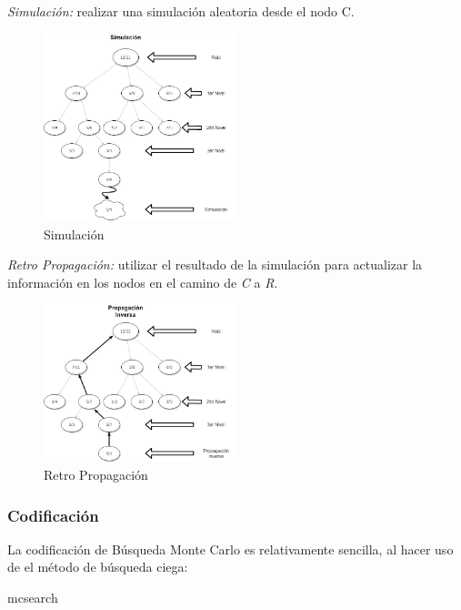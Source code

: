 \documentclass[11pt,]{article}
\newenvironment{Shaded}{\begin{snugshade}}{\end{snugshade}}
\newcommand{\NormalTok}[1]{#1}
\begin{document}
\newpage

\emph{Simulación:} realizar una simulación aleatoria desde el nodo C.

\begin{figure}
\centering
\includegraphics[width=0.5\textwidth,height=\textheight]{./diagramas/simulacion.jpg}
\caption{Simulación}
\end{figure}

\emph{Retro Propagación:} utilizar el resultado de la simulación para
actualizar la información en los nodos en el camino de \emph{C} a
\emph{R}.

\begin{figure}
\centering
\includegraphics[width=0.5\textwidth,height=\textheight]{./diagramas/backpropagation.jpg}
\caption{Retro Propagación}
\end{figure}

\newpage

\hypertarget{codificaciuxf3n}{%
\subsubsection{Codificación}\label{codificaciuxf3n}}

La codificación de Búsqueda Monte Carlo es relativamente sencilla, al
hacer uso de el método de búsqueda ciega:

\begin{Shaded}
\begin{Highlighting}[]
\NormalTok{mcsearch}
\end{Highlighting}
\end{Shaded}
\end{document}
